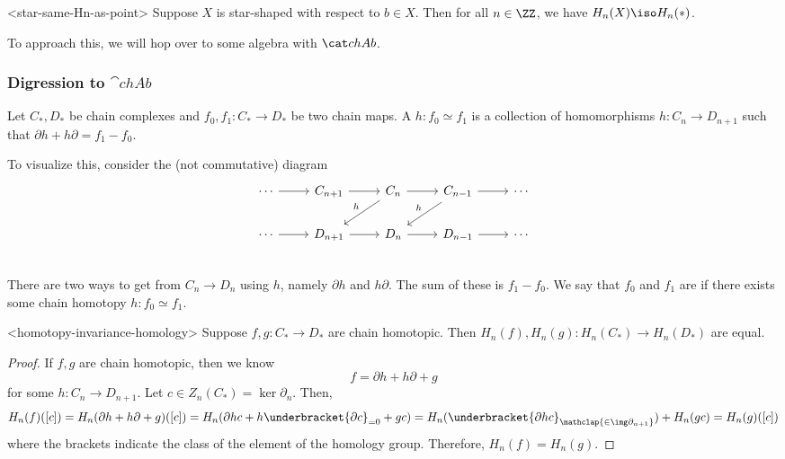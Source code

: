\documentclass{standalone}
\begin{document}
\begin{theorem}<star-same-Hn-as-point>
  Suppose \(X\) is star-shaped with respect to \(b \in X\).
  Then for all \(n \in \ZZ\), we have \(H_n(X) \iso H_n(*)\).
\end{theorem}

To approach this, we will hop over to some algebra with \(\cchAb\).

\subsubsection{Digression to \(\cat{chAb}\)}
Let \(C_*, D_*\) be chain complexes and \(f_0, f_1 \colon C_* \to D_*\) be
two chain maps. A  \(h \colon f_0 \simeq f_1\) is
a collection of homomorphisms \(h \colon C_n \to D_{n + 1}\) such that
\(\partial h + h \partial = f_1 - f_0\).

To visualize this, consider the (not commutative) diagram
\[
  \begin{tikzcd}
    \cdots  \ar[r] &
      C_{n+1} \ar[r] &
      C_{n  } \ar[r] \ar[ld, "h"'] &
      C_{n-1} \ar[r] \ar[ld, "h"'] &
      \cdots \\
    \cdots  \ar[r] &
      D_{n+1} \ar[r] &
      D_{n  } \ar[r] &
      D_{n-1} \ar[r] &
      \cdots \\
  \end{tikzcd}
\]
There are two ways to get from \(C_n \to D_n\) using \(h\),
namely \(\partial h\) and \(h \partial\). The sum of these is \(f_1 - f_0\).
We say that \(f_0\) and \(f_1\) are  if there exists
some chain homotopy \(h \colon f_0 \simeq f_1\).

\begin{lemma}<homotopy-invariance-homology>
  Suppose \(f, g \colon C_* \to D_*\) are chain homotopic.
  Then \(H_n(f), H_n(g) \colon H_n(C_*) \to H_n(D_*)\) are equal.
\end{lemma}
\begin{proof}
  If \(f, g\) are chain homotopic, then we know
  \[
    f = \partial h + h \partial + g
  \]
  for some \(h\colon C_n \to D_{n+1}\).
  Let \(c \in Z_n(C_*) = \ker \partial_n\).
  Then,
  \[
    H_n(f)([c]) = H_n(\partial h + h \partial + g)([c])
      = H_n(\partial h c + h \underbracket{\partial c}_{=0} + g c)
      = H_n(\underbracket{\partial h c}_{\mathclap{\in \img \partial_{n+1}}})
        + H_n(g c)
      = H_n(g)([c])
  \]
  where the brackets indicate the class of the element of the homology group.
  Therefore, \(H_n(f) = H_n(g)\).
\end{proof}
\end{document}
